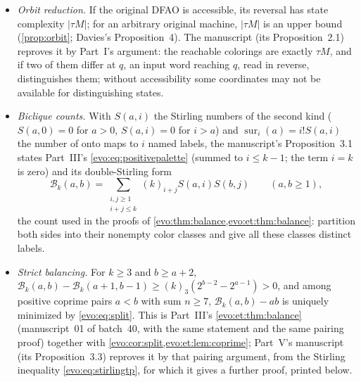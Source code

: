 \documentclass[11pt,a4paper]{article}
\numberwithin{equation}{section}
\theoremstyle{definition}
\theoremstyle{remark}
\newcommand{\fall}[2]{(#1)_{#2}}
\newcommand{\Bip}{\mathcal B}
\newcommand{\sur}{\operatorname{sur}}
\begin{document}
\begin{itemize}
\item \emph{Orbit reduction.} If the original DFAO is accessible, its
 reversal has state complexity $|\tau M|$; for an arbitrary original
 machine, $|\tau M|$ is an upper bound (\cref{prop:orbit}; Davies's
 Proposition~4). The manuscript (its Proposition~2.1) reproves it by
 Part~I's argument: the reachable colorings are exactly $\tau M$, and if two
 of them differ at $q$, an input word reaching $q$, read in reverse,
 distinguishes them; without accessibility some coordinates may not be
 available for distinguishing states.
\item \emph{Biclique counts.} With $S(a,i)$ the Stirling numbers of the
 second kind ($S(a,0)=0$ for $a>0$, $S(a,i)=0$ for $i>a$) and
 $\sur_i(a)=i!S(a,i)$ the number of onto maps to $i$ named labels, the
 manuscript's Proposition~3.1 states Part~III's
 \eqref{evo:eq:positivepalette} (summed to $i\le k-1$; the term $i=k$ is
 zero) and its double-Stirling form
 \[
 \Bip_k(a,b)=\sum_{\substack{i,j\ge1\\i+j\le k}}\fall{k}{i+j}S(a,i)S(b,j)
 \qquad(a,b\ge1),
 \]
 the count used in the proofs of \cref{evo:thm:balance,evo:et:thm:balance}:
 partition both sides into their nonempty color classes and give all these
 classes distinct labels.
\item \emph{Strict balancing.} For $k\ge3$ and $b\ge a+2$,
 $\Bip_k(a,b)-\Bip_k(a+1,b-1)\ge\fall{k}{3}(2^{b-2}-2^{a-1})>0$, and among
 positive coprime pairs $a<b$ with sum $n\ge7$, $\Bip_k(a,b)-ab$ is uniquely
 minimized by \eqref{evo:eq:split}. This is Part~III's
 \cref{evo:et:thm:balance} (manuscript~01 of batch~40, with the same
 statement and the same pairing proof) together with
 \cref{evo:cor:split,evo:et:lem:coprime}; Part~V's manuscript (its
 Proposition~3.3) reproves it by that pairing argument, from the
 Stirling inequality \eqref{evo:eq:stirlingtp}, for which it gives a
 further proof, printed below.
\end{itemize}
\end{document}
